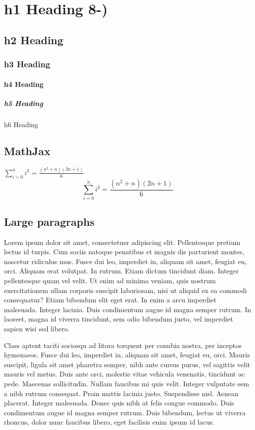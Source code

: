 \documentclass[]{article}
\date{}
\let\oldparagraph\paragraph
\renewcommand{\paragraph}[1]{\oldparagraph{#1}\mbox{}}
\let\oldsubparagraph\subparagraph
\renewcommand{\subparagraph}[1]{\oldsubparagraph{#1}\mbox{}}
\begin{document}
\section{h1 Heading 8-)}\label{h1-heading-8-}

\subsection{h2 Heading}\label{h2-heading}

\subsubsection{h3 Heading}\label{h3-heading}

\paragraph{h4 Heading}\label{h4-heading}

\subparagraph{h5 Heading}\label{h5-heading}

h6 Heading

\subsection{MathJax}\label{mathjax}

\(\sum_{i=0}^n i^2 = \frac{(n^2+n)(2n+1)}{6}\)
\[\sum_{i=0}^n i^2 = \frac{(n^2+n)(2n+1)}{6}\]

\subsection{Large paragraphs}\label{large-paragraphs}

Lorem ipsum dolor sit amet, consectetuer adipiscing elit. Pellentesque
pretium lectus id turpis. Cum sociis natoque penatibus et magnis dis
parturient montes, nascetur ridiculus mus. Fusce dui leo, imperdiet in,
aliquam sit amet, feugiat eu, orci. Aliquam erat volutpat. In rutrum.
Etiam dictum tincidunt diam. Integer pellentesque quam vel velit. Ut
enim ad minima veniam, quis nostrum exercitationem ullam corporis
suscipit laboriosam, nisi ut aliquid ex ea commodi consequatur? Etiam
bibendum elit eget erat. In enim a arcu imperdiet malesuada. Integer
lacinia. Duis condimentum augue id magna semper rutrum. In laoreet,
magna id viverra tincidunt, sem odio bibendum justo, vel imperdiet
sapien wisi sed libero.

Class aptent taciti sociosqu ad litora torquent per conubia nostra, per
inceptos hymenaeos. Fusce dui leo, imperdiet in, aliquam sit amet,
feugiat eu, orci. Mauris suscipit, ligula sit amet pharetra semper, nibh
ante cursus purus, vel sagittis velit mauris vel metus. Duis ante orci,
molestie vitae vehicula venenatis, tincidunt ac pede. Maecenas
sollicitudin. Nullam faucibus mi quis velit. Integer vulputate sem a
nibh rutrum consequat. Proin mattis lacinia justo. Suspendisse nisl.
Aenean placerat. Integer malesuada. Donec quis nibh at felis congue
commodo. Duis condimentum augue id magna semper rutrum. Duis bibendum,
lectus ut viverra rhoncus, dolor nunc faucibus libero, eget facilisis
enim ipsum id lacus.
\end{document}
